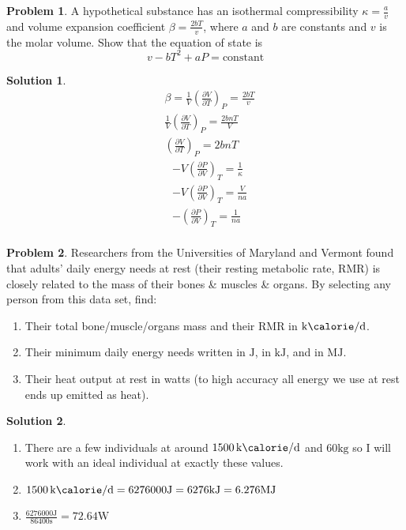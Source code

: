\documentclass[10pt]{article}
\theoremstyle{definition}
\newtheorem{problem}{Problem}
\newtheorem{soln}{Solution}
\begin{document}
\begin{problem}
A hypothetical substance has an isothermal compressibility $\kappa = \frac{a}{v}$ and volume expansion coefficient $\beta=\frac{2bT}{v}$,
where $a$ and $b$ are constants and $v$ is the molar volume. Show that the equation of state is $$v-bT^2+aP=\mathrm{constant}$$
\end{problem}
\begin{soln}
  \begin{align*}
    & \beta=\frac{1}{V}\left(\frac{\partial V}{\partial T}\right)_P=\frac{2bT}{v}\\
    & \frac{1}{V}\left(\frac{\partial V}{\partial T}\right)_P=\frac{2bnT}{V}\\
    & \left(\frac{\partial V}{\partial T}\right)_P=2bnT
  \end{align*}
  \begin{align*}
    & -V\left(\frac{\partial P}{\partial V}\right)_T=\frac{1}{\kappa}\\
    & -V\left(\frac{\partial P}{\partial V}\right)_T=\frac{V}{na}\\
    & -\left(\frac{\partial P}{\partial V}\right)_T=\frac{1}{na}\\
  \end{align*}
\end{soln}

\begin{problem}
Researchers from the Universities of Maryland and Vermont found that adults' daily energy needs at rest (their resting metabolic rate, RMR)
is closely related to the mass of their bones \& muscles \& organs. By selecting any person from this data set, find:
\begin{enumerate}[label=(\alph*)]
  \item Their total bone/muscle/organs mass and their RMR in $\unit{\kilo\calorie\per\day}$.
  \item Their minimum daily energy needs written in $\unit{\joule}$, in $\unit{\kilo\joule}$, and in $\unit{\mega\joule}$.
  \item Their heat output at rest in watts (to high accuracy all energy we use at rest ends up emitted as heat).
\end{enumerate}
\end{problem}
\begin{soln}~
  \begin{enumerate}[label=(\alph*)]
    \item There are a few individuals at around $\qty{1500}{\kilo\calorie\per\day}$ and $60\unit{\kilo\gram}$ so I will work with an ideal individual
    at exactly these values.
    \item $\qty{1500}{\kilo\calorie\per\day}=6276000\unit{\joule}=6276\unit{\kilo\joule}=6.276\unit{\mega\joule}$
    \item $\displaystyle\frac{6276000\unit{\joule}}{86400\unit{\second}}=72.64\unit{\watt}$
  \end{enumerate}
\end{soln}
\end{document}
